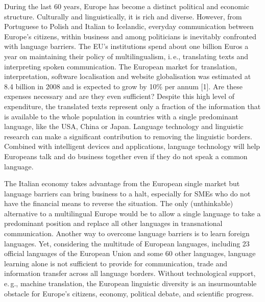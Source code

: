 \begin{multicols}{2}

  During the last 60 years, Europe has become a distinct political and economic structure. Culturally and linguistically, it is rich and diverse. However, from Portuguese to Polish and Italian to Icelandic, everyday communication between Europe's citizens, within business and among politicians is inevitably confronted with language barriers. The EU's institutions spend about one billion Euros a year on maintaining their policy of multilingualism, i.\,e., translating texts and interpreting spoken communication. The European market for translation, interpretation, software localisation and website globalisation was estimated at 8.4 billion in 2008 and is expected to grow by 10\% per annum [1]. Are these expenses necessary and are they even sufficient? Despite this high level of expenditure, the translated texts represent only a fraction of the information that is available to the whole population in countries with a single predominant language, like the USA, China or Japan.  Language technology and linguistic research can make a significant contribution to removing the linguistic borders.  Combined with intelligent devices and applications, language technology will help Europeans talk and do business together even if they do not speak a common language.


The Italian economy takes advantage from the European single market but language barriers can bring business to a halt, especially for SMEs who do not have the financial means to reverse the situation. The only (unthinkable) alternative to a multilingual Europe would be to allow a single language to take a predominant position and replace all other languages in transnational communication. Another way to overcome language barriers is to learn foreign languages. Yet, considering the multitude of European languages, including 23 official languages of the European Union and some 60 other languages, language learning alone is not sufficient to provide for communication, trade and information transfer across all language borders. Without technological support, e.\,g., machine translation, the European linguistic diversity is an insurmountable obstacle for Europe's citizens, economy, political debate, and scientific progress.


\end{multicols}
